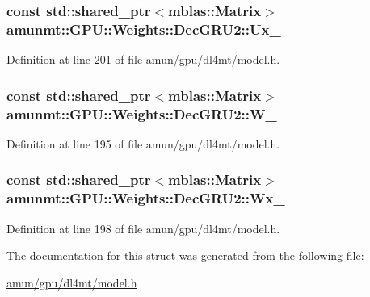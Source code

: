 \subsubsection[{\texorpdfstring{Ux\+\_\+}{Ux_}}]{\setlength{\rightskip}{0pt plus 5cm}const std\+::shared\+\_\+ptr$<${\bf mblas\+::\+Matrix}$>$ amunmt\+::\+G\+P\+U\+::\+Weights\+::\+Dec\+G\+R\+U2\+::\+Ux\+\_\+}\hypertarget{structamunmt_1_1GPU_1_1Weights_1_1DecGRU2_a87065b9a3123aeed1d81fbe0ff51c9c7}{}\label{structamunmt_1_1GPU_1_1Weights_1_1DecGRU2_a87065b9a3123aeed1d81fbe0ff51c9c7}


Definition at line 201 of file amun/gpu/dl4mt/model.\+h.

\subsubsection[{\texorpdfstring{W\+\_\+}{W_}}]{\setlength{\rightskip}{0pt plus 5cm}const std\+::shared\+\_\+ptr$<${\bf mblas\+::\+Matrix}$>$ amunmt\+::\+G\+P\+U\+::\+Weights\+::\+Dec\+G\+R\+U2\+::\+W\+\_\+}\hypertarget{structamunmt_1_1GPU_1_1Weights_1_1DecGRU2_a150e5115de1c89c933d4d8aab97df772}{}\label{structamunmt_1_1GPU_1_1Weights_1_1DecGRU2_a150e5115de1c89c933d4d8aab97df772}


Definition at line 195 of file amun/gpu/dl4mt/model.\+h.

\subsubsection[{\texorpdfstring{Wx\+\_\+}{Wx_}}]{\setlength{\rightskip}{0pt plus 5cm}const std\+::shared\+\_\+ptr$<${\bf mblas\+::\+Matrix}$>$ amunmt\+::\+G\+P\+U\+::\+Weights\+::\+Dec\+G\+R\+U2\+::\+Wx\+\_\+}\hypertarget{structamunmt_1_1GPU_1_1Weights_1_1DecGRU2_ac22414e6cc5d443784472ea3097aea9c}{}\label{structamunmt_1_1GPU_1_1Weights_1_1DecGRU2_ac22414e6cc5d443784472ea3097aea9c}


Definition at line 198 of file amun/gpu/dl4mt/model.\+h.



The documentation for this struct was generated from the following file\+:\begin{DoxyCompactItemize}
\item 
\hyperlink{amun_2gpu_2dl4mt_2model_8h}{amun/gpu/dl4mt/model.\+h}\end{DoxyCompactItemize}
